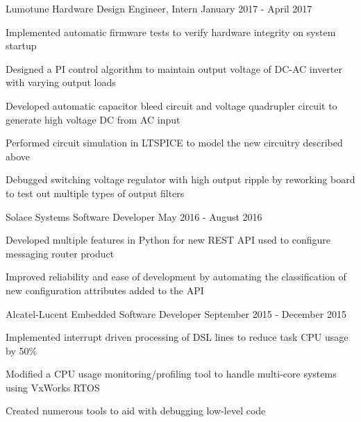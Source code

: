 \begin{cventries}
  \cventry
    {Lumotune} %
    {Hardware Design Engineer, Intern} %
    {January 2017 - April 2017} %
    {}
    {
      \begin{cvitems} %
        \item {Implemented automatic firmware tests to verify hardware integrity on system startup}
        \item {Designed a PI control algorithm to maintain output voltage of DC-AC inverter with varying output loads}
        \item {Developed automatic capacitor bleed circuit and voltage quadrupler circuit to generate high voltage DC from AC input}
        \item {Performed circuit simulation in LTSPICE to model the new circuitry described above}
        \item {Debugged switching voltage regulator with high output ripple by reworking board to test out multiple types of output filters}
      \end{cvitems}
    }

  \cventry
    {Solace Systems} %
    {Software Developer} %
    {May 2016 - August 2016} %
    {}
    {
      \begin{cvitems} %
        \item {Developed multiple features in Python for new REST API used to configure messaging router product}
        \item {Improved reliability and ease of development by automating the classification of new configuration attributes added to the API}
      \end{cvitems}
    }

  \cventry
    {Alcatel-Lucent} %
    {Embedded Software Developer} %
    {September 2015 - December 2015} %
    {}
    {
      \begin{cvitems} %
        \item {Implemented interrupt driven processing of DSL lines to reduce task CPU usage by 50\%}
        \item {Modified a CPU usage monitoring/profiling tool to handle multi-core systems using VxWorks RTOS}
        \item {Created numerous tools to aid with debugging low-level code}
      \end{cvitems}
    }


\end{cventries}
